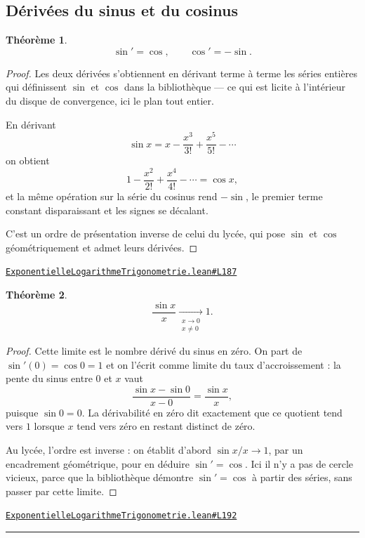 \documentclass[11pt,a4paper]{article}
\theoremstyle{definition}
\theoremstyle{plain}
\newtheorem{theoreme}{Théorème}
\newcommand{\source}[2]{\par\smallskip\noindent\hfill{\footnotesize\href{#1}{\texttt{#2}}}\par\smallskip}
\begin{document}
\subsection{Dérivées du sinus et du cosinus}

\begin{theoreme}
\[ \sin' = \cos, \qquad \cos' = -\sin . \]
\end{theoreme}

\begin{proof}
Les deux dérivées s'obtiennent en dérivant terme à terme les séries entières qui définissent
$\sin$ et $\cos$ dans la bibliothèque — ce qui est licite à l'intérieur du disque de
convergence, ici le plan tout entier.

En dérivant
\[ \sin x = x - \frac{x^3}{3!} + \frac{x^5}{5!} - \cdots \]
on obtient
\[ 1 - \frac{x^2}{2!} + \frac{x^4}{4!} - \cdots = \cos x , \]
et la même opération sur la série du cosinus rend $-\sin$, le premier terme constant
disparaissant et les signes se décalant.

C'est un ordre de présentation inverse de celui du lycée, qui pose $\sin$ et $\cos$
géométriquement et admet leurs dérivées.
\end{proof}
\source{https://github.com/Commutator-IO/learn-lean/blob/main/courses/02-lycee/05-exponentielle-logarithme-trigonometrie/ExponentielleLogarithmeTrigonometrie.lean\#L187}{ExponentielleLogarithmeTrigonometrie.lean\#L187}

\begin{theoreme}
\[ \frac{\sin x}{x} \xrightarrow[\substack{x \to 0 \\ x \ne 0}]{} 1 . \]
\end{theoreme}

\begin{proof}
Cette limite est le nombre dérivé du sinus en zéro. On part de $\sin'(0) = \cos 0 = 1$ et
on l'écrit comme limite du taux d'accroissement : la pente du sinus entre $0$ et $x$ vaut
\[ \frac{\sin x - \sin 0}{x - 0} = \frac{\sin x}{x} , \]
puisque $\sin 0 = 0$. La dérivabilité en zéro dit exactement que ce quotient tend vers $1$
lorsque $x$ tend vers zéro en restant distinct de zéro.

\medskip\noindent
Au lycée, l'ordre est inverse : on établit d'abord $\sin x / x \to 1$, par un encadrement
géométrique, pour en déduire $\sin' = \cos$. Ici il n'y a pas de cercle vicieux, parce que
la bibliothèque démontre $\sin' = \cos$ à partir des séries, sans passer par cette limite.
\end{proof}
\source{https://github.com/Commutator-IO/learn-lean/blob/main/courses/02-lycee/05-exponentielle-logarithme-trigonometrie/ExponentielleLogarithmeTrigonometrie.lean\#L192}{ExponentielleLogarithmeTrigonometrie.lean\#L192}

\vfill
\noindent\rule{0.35\linewidth}{0.4pt}\par
{}
\end{document}
